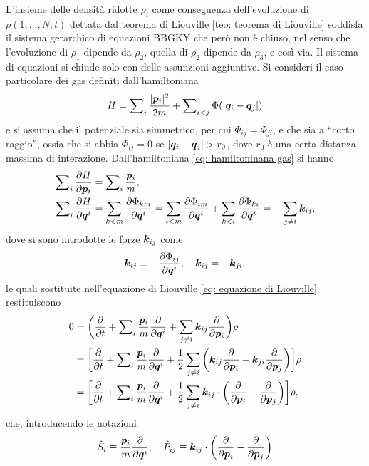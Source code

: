 L'insieme delle densità ridotte $\rho_i$ come conseguenza dell'evoluzione di $\rho(1,\dots,N;t)$ dettata dal teorema di Liouville \eqref{teo: teorema di Liouville} soddisfa il sistema gerarchico di equazioni BBGKY che però non è chiuso, nel senso che l'evoluzione di $\rho_1$ dipende da $\rho_2$, quella di $\rho_2$ dipende da $\rho_3$, e così via. Il sistema di equazioni si chiude solo con delle assunzioni aggiuntive. Si consideri il caso particolare dei gas definiti dall'hamiltoniana 
\begin{equation}
\label{eq: hamiltoninana gas}
    H = \sum\nolimits_i\frac{|\bm{p}_i|^2}{2m} + \sum\nolimits_{i<j}\Phi(|\bm{q}_i - \bm{q}_j|)
\end{equation}
e si assuma che il potenziale sia simmetrico, per cui $\Phi_{ij} = \Phi_{ji}$, e che sia a ``corto raggio'', ossia che si abbia $\Phi_{ij} = 0$ se $|\bm{q}_i - \bm{q}_j| > r_0$, dove $r_0$ è una certa distanza massima di interazione. Dall'hamiltoniana \eqref{eq: hamiltoninana gas} si hanno
\begin{align}
    \sum\nolimits_i\frac{\partial H}{\partial \bm{p}_i} &= \sum\nolimits_i\frac{\bm{p}_i}{m}, \\
    \sum\nolimits_i\frac{\partial H}{\partial \bm{q}^i} &= \sum_{k < m} \frac{\partial \Phi_{km}}{\partial \bm{q}^i} = \sum_{i < m}\frac{\partial \Phi_{im}}{\partial \bm{q}^i} + \sum_{k < i}\frac{\partial \Phi_{ki}}{\partial \bm{q}^i} = -\sum_{j\neq i}\bm{k}_{ij},
\end{align}
dove si sono introdotte le forze $\bm{k}_{ij}$ come
\begin{equation}
    \bm{k}_{ij} \equiv -\frac{\partial \Phi_{ij}}{\partial \bm{q}^i},\quad \bm{k}_{ij} = -\bm{k}_{ji},
\end{equation}
le quali sostituite nell'equazione di Liouville \eqref{eq: equazione di Liouville} restituiscono
\begin{equation}
    \begin{split}
        0 &= \bigg(\frac{\partial}{\partial t} + \sum\nolimits_i\frac{\bm{p}_i}{m}\frac{\partial}{\partial \bm{q}^i} + \sum_{j\neq i}\bm{k}_{ij}\frac{\partial}{\partial \bm{p}_i}\bigg)\rho \\
        &= \bigg[\frac{\partial}{\partial t} + \sum\nolimits_i\frac{\bm{p}_i}{m}\frac{\partial}{\partial \bm{q}^i} + \frac{1}{2}\sum_{j\neq i}\bigg(\bm{k}_{ij}\frac{\partial}{\partial \bm{p}_i} + \bm{k}_{ji}\frac{\partial}{\partial \bm{p}_j}\bigg)\bigg] 
        \rho \\
        &= \bigg[\frac{\partial}{\partial t} + \sum\nolimits_i\frac{\bm{p}_i}{m}\frac{\partial}{\partial \bm{q}^i} + \frac{1}{2}\sum_{j\neq i}\bm{k}_{ij}\cdot\bigg(\frac{\partial}{\partial \bm{p}_i} - \frac{\partial}{\partial \bm{p}_j}\bigg)\bigg]\rho,
    \end{split}
\end{equation}
che, introducendo le notazioni
\begin{equation}
    \hat{S}_i \equiv \frac{\bm{p}_i}{m}\frac{\partial}{\partial \bm{q}^i},\quad \hat{P}_{ij} \equiv \bm{k}_{ij}\cdot\bigg(\frac{\partial}{\partial \bm{p}_i} - \frac{\partial}{\partial \bm{p}_j}\bigg)
\end{equation}
